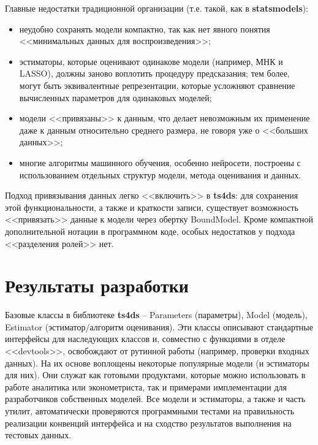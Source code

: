 \documentclass[a4paper,14pt]{extreport}
\begin{document}
	Главные недостатки традиционной организации (т.е. такой, как в \textbf{statsmodels}):
	
	\begin{itemize}
		\item неудобно сохранять модели компактно, так как нет явного понятия <<минимальных данных для воспроизведения>>;
		\item эстиматоры, которые оценивают одинакове модели (например, МНК и LASSO), должны заново воплотить процедуру предсказания; тем более, могут быть эквивалентные репрезентации, которые усложняют сравнение вычисленных параметров для одинаковых моделей;
		\item модели <<привязаны>> к данным, что делает невозможным их применение даже к данным относительно среднего размера, не говоря уже о <<больших данных>>;
		\item многие алгоритмы машинного обучения, особенно нейросети, построены с использованием отдельных структур модели, метода оценивания и данных.
	\end{itemize}
	
	Подход привязывания данных легко <<включить>> в \textbf{ts4ds}: для сохранения этой функциональности, а также и краткости записи, существует возможность <<привязать>> данные к модели через обертку BoundModel. Кроме компактной дополнительной нотации в программном коде, особых недостатков у подхода <<разделения ролей>> нет.
	
	\section{Результаты разработки}
	
	Базовые классы в библиотеке \textbf{ts4ds} – Parameters (параметры), Model (модель), Estimator (эстиматор/алгоритм оценивания). Эти классы описывают стандартные интерфейсы для наследующих классов и, совместно с функциями в отделе <<devtools>>, освобождают от рутинной работы (например, проверки входных данных). На их основе воплощены некоторые популярные модели (и эстиматоры для них). Они служат как готовыми продуктами, которые можно использовать в работе аналитика или эконометриста, так и примерами имплементации для разработчиков собственных моделей. Все модели и эстиматоры, а также и часть утилит, автоматически проверяются программными тестами на правильность реализации конвенций интерфейса и на сходство результатов выполнения на тестовых данных.
	
	
\end{document}
